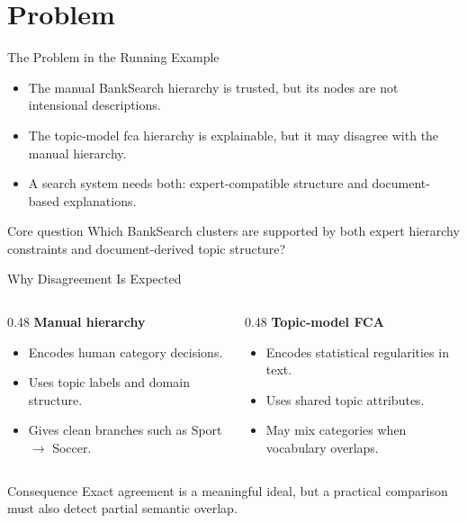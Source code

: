 \section{Problem}

\begin{frame}{The Problem in the Running Example}
\begin{itemize}
    \item The manual BankSearch hierarchy is trusted, but its nodes are not intensional descriptions.
    \item The topic-model \ac{fca} hierarchy is explainable, but it may disagree with the manual hierarchy.
    \item A search system needs both: expert-compatible structure and document-based explanations.
\end{itemize}

\vspace{0.5em}
\begin{alertblock}{Core question}
Which BankSearch clusters are supported by both expert hierarchy constraints and document-derived topic structure?
\end{alertblock}
\end{frame}

\begin{frame}{Why Disagreement Is Expected}
\begin{columns}[T,onlytextwidth]
\begin{column}{0.48\textwidth}
\textbf{Manual hierarchy}
\begin{itemize}
    \item Encodes human category decisions.
    \item Uses topic labels and domain structure.
    \item Gives clean branches such as Sport $\rightarrow$ Soccer.
\end{itemize}
\end{column}
\begin{column}{0.48\textwidth}
\textbf{Topic-model FCA}
\begin{itemize}
    \item Encodes statistical regularities in text.
    \item Uses shared topic attributes.
    \item May mix categories when vocabulary overlaps.
\end{itemize}
\end{column}
\end{columns}

\vspace{0.6em}
\begin{block}{Consequence}
Exact agreement is a meaningful ideal, but a practical comparison must also detect partial semantic overlap.
\end{block}
\end{frame}

